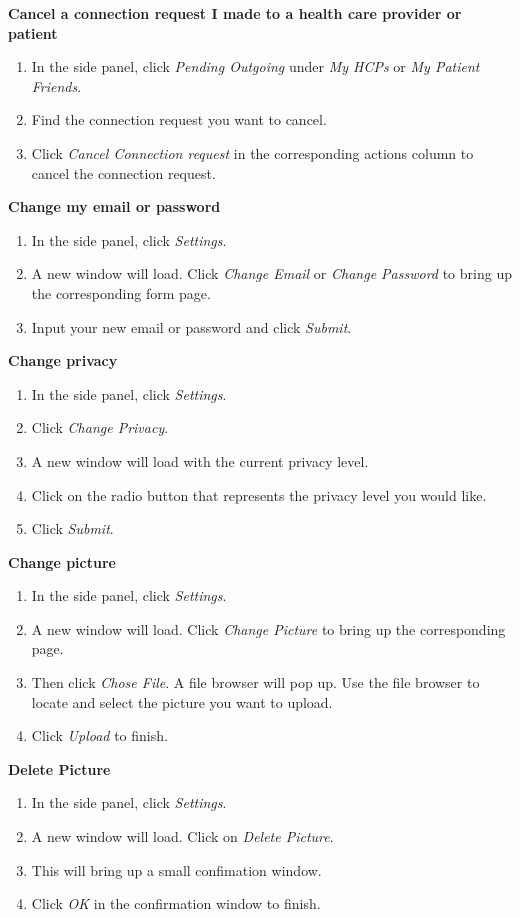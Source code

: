 \textbf{Cancel a connection request I made to a health care provider or patient}
\begin{enumerate}
\item In the side panel, click \textit{Pending Outgoing} under \textit{My HCPs} or \textit{My Patient Friends}.
\item Find the connection request you want to cancel.
\item Click \textit{Cancel Connection request} in the corresponding actions column to cancel the connection request.
\end{enumerate}
\textbf{Change my email or password}
\begin{enumerate}
\item In the side panel, click \textit{Settings}.
\item A new window will load. Click \textit{Change Email} or \textit{Change Password} to bring up the corresponding form page.
\item Input your new email or password and click \textit{Submit}.
\end{enumerate}
\textbf{Change privacy}
\begin{enumerate}
\item In the side panel, click \textit{Settings}.
\item Click \textit{Change Privacy}.
\item A new window will load with the current privacy level.
\item Click on the radio button that represents the privacy level you would like.
\item Click \textit{Submit}. 
\end{enumerate}
\textbf{Change picture}
\begin{enumerate}
\item In the side panel, click \textit{Settings}.
\item A new window will load. Click \textit{Change Picture} to bring up the corresponding page.
\item Then click \textit{Chose File}. A file browser will pop up. Use the file browser to locate and select the picture you want to upload.
\item Click \textit{Upload} to finish.
\end{enumerate}
\textbf{Delete Picture}
\begin{enumerate}
\item In the side panel, click \textit{Settings}.
\item A new window will load. Click on \textit{Delete Picture}.
\item This will bring up a small confimation window.
\item Click \textit{OK} in the confirmation window to finish.
\end{enumerate}
